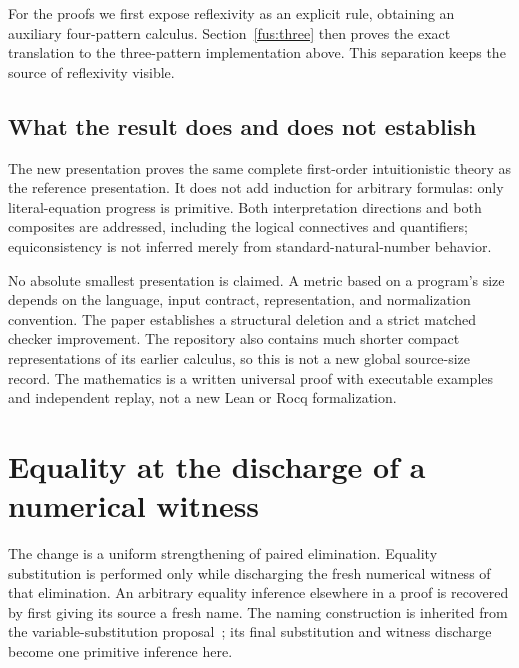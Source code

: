 \documentclass[11pt,letterpaper]{article}
\theoremstyle{definition}\newtheorem{definition}[theorem]{Definition}
\theoremstyle{remark}\newtheorem{remark}[theorem]{Remark}
\begin{document}
For the proofs we first expose reflexivity as an explicit rule, obtaining
an auxiliary four-pattern calculus. Section~\ref{fus:three} then proves
the exact translation to the three-pattern implementation above.
This separation keeps the source of reflexivity visible.

\subsection{What the result does and does not establish}

The new presentation proves the same complete first-order intuitionistic
theory as the reference presentation. It does not add induction for arbitrary
formulas: only literal-equation progress is primitive. Both interpretation
directions and both composites are addressed, including the logical
connectives and quantifiers; equiconsistency is not inferred merely from
standard-natural-number behavior.

No absolute smallest presentation is claimed. A metric based on a program's
size depends on the language, input contract, representation, and normalization
convention. The paper establishes a structural deletion and a strict matched
checker improvement. The repository also contains much shorter compact
representations of its earlier calculus, so this is not a new global source-size
record. The mathematics is a written universal proof with executable examples
and independent replay, not a new Lean or Rocq formalization.

\section{Equality at the discharge of a numerical witness}
\label{fus:section}

The change is a uniform strengthening of paired elimination. Equality
substitution is performed only while discharging the fresh numerical witness
of that elimination. An arbitrary equality inference elsewhere in a proof is
recovered by first giving its source a fresh name. The naming construction is
inherited from the variable-substitution proposal~\cite{variable}; its final
substitution and witness discharge become one primitive inference here.
\end{document}
